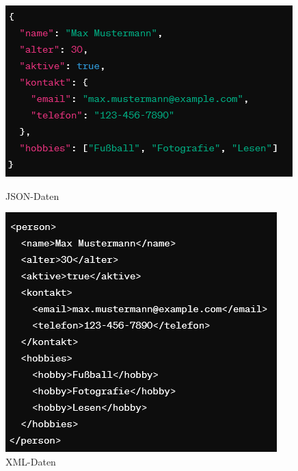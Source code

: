\begin{figure}[h]
	\centering
	\begin{minipage}{0.32\textwidth}
		\centering
		\includegraphics[width=\textwidth]{figures/jsonexample.png}
		\caption{JSON-Daten}
		\label{fig:json}
	\end{minipage}\hfill
	\begin{minipage}{0.32\textwidth}
		\centering
		\includegraphics[width=\textwidth]{figures/xmlexample.png}
		\caption{XML-Daten}
		\label{fig:xml}
	\end{minipage}\hfill
	\begin{minipage}{0.32\textwidth}
		\centering

\end{minipage}
\end{figure}
